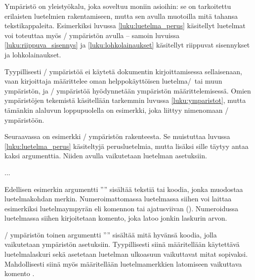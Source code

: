 Ympäristö  on yleistyökalu, joka soveltuu moniin
asioihin: se on tarkoitettu erilaisten luetelmien rakentamiseen, mutta
sen avulla muotoilla mitä tahansa tekstikappaleita. Esimerkiksi luvussa
\ref{luku:luetelma_perus} käsitellyt luetelmat voi toteuttaa myös
\-/ ympäristön avulla -- samoin luvuissa
\ref{luku:riippuva_sisennys} ja \ref{luku:lohkolainaukset} käsitellyt
riippuvat sisennykset ja lohkolainaukset.

Tyypillisesti \-/ ympäristöä ei käytetä dokumentin
kirjoittamisessa sellaisenaan, vaan kirjoittaja määrittelee oman
helppokäyttöisen luetelma\-/\ tai muun ympäristön, ja
\-/ ympäristöä hyödynnetään ympäristön
määrittelemisessä. Omien ympäristöjen tekemistä käsitellään tarkemmin
luvussa \ref{luku:ymparistot}, mutta tämänkin alaluvun loppupuolella on
esimerkki, joka liittyy nimenomaan \-/ ympäristöön.

Seuraavassa on esimerkki \-/ ympäristön rakenteesta. Se
muistuttaa luvussa \ref{luku:luetelma_perus} käsiteltyjä perusluetelmia,
mutta lisäksi sille täytyy antaa kaksi argumenttia. Niiden avulla
vaikutetaan luetelman asetuksiin.

\begin{koodilohkosis}
\begin{list}{merkki}{asetukset}
\item ...
\end{list}
\end{koodilohkosis}

Edellisen esimerkin argumentti '''' sisältää tekstiä tai
koodia, jonka muodostaa luetelmakohdan merkin. Numeroimattomassa
luetelmassa siihen voi laittaa esimerkiksi luetelmaympyrän eli komennon
 tai ajatusviivan (\koodi{--}). Numeroidussa
luetelmassa siihen kirjoitetaan komento, joka latoo jonkin laskurin
arvon.

\-/ ympäristön toinen argumentti
'''' sisältää mitä hyvänsä koodia, jolla
vaikutetaan ympäristön asetuksiin. Tyypillisesti siinä määritellään
käytettävä luetelmalaskuri sekä asetetaan luetelman ulkoasuun
vaikuttavat mitat sopivaksi. Mahdollisesti siinä myös määritellään
luetelmamerkkien latomiseen vaikuttava komento .

